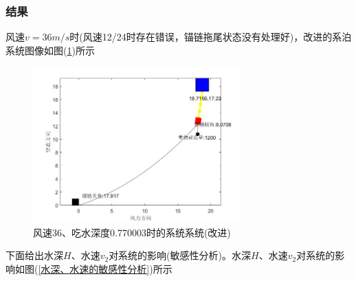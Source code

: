         \subsubsection{结果}
            \par
            风速$v=36m/s$时(风速12/24时存在错误，锚链拖尾状态没有处理好)，改进的系泊系统图像如图(\ref{风速36、吃水深度0.770003时的系统系统(改进)})所示
            \begin{figure}[H]
                \centering
                \includegraphics[width=8cm]{images/v_wind_36_h_xitong_gaijin.jpg}
                \caption{风速36、吃水深度0.770003时的系统系统(改进)}
                \label{风速36、吃水深度0.770003时的系统系统(改进)}
            \end{figure}
            \par
            下面给出水深$H$、水速$v_2$对系统的影响(敏感性分析)。水深$H$、水速$v_2$对系统的影响如图(\ref{水深、水速的敏感性分析})所示
